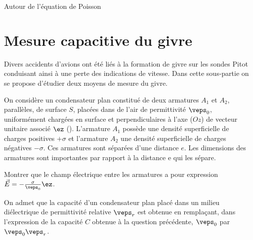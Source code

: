 \begin{exo}[PC][1][devoir]{Autour de l’équation de Poisson}
\begin{quest}
  \end{quest}
  
  
  \section{Mesure capacitive du givre}
  Divers accidents d’avions ont été liés à la formation de givre sur les sondes Pitot conduisant ainsi à
  une perte des indications de vitesse. Dans cette sous-partie on se propose d’étudier deux moyens de
  mesure du givre.
  
  On considère un condensateur plan constitué de deux armatures $A_1$ et $A_2$, parallèles, de surface $S$,
  placées dans de l’air de permittivité $\veps_0$, uniformément chargées en surface et perpendiculaires à
  l’axe ($Oz$) de vecteur unitaire associé $\ez$ (). L’armature $A_1$ possède une densité
  superficielle de charges positives $+\sigma$ et l’armature $A_2$ une densité superficielle de charges négatives
  $-\sigma$. Ces armatures sont séparées d’une distance $e$. Les dimensions des armatures sont importantes
  par rapport à la distance e qui les sépare.
  
  
  \begin{quest}
    \item  Montrer que le champ électrique entre les armatures a pour expression $\Vec{E} = -\frac{\sigma}{\veps_0}\ez$.
  \end{quest}
  
  On admet que la capacité d’un condensateur plan placé dans un milieu diélectrique de permittivité
  relative $\veps_r$ est obtenue en remplaçant, dans l’expression de la capacité $C$ obtenue à la question
  précédente, $\veps_0$ par $\veps_0 \veps_r$.
  

\end{exo}
